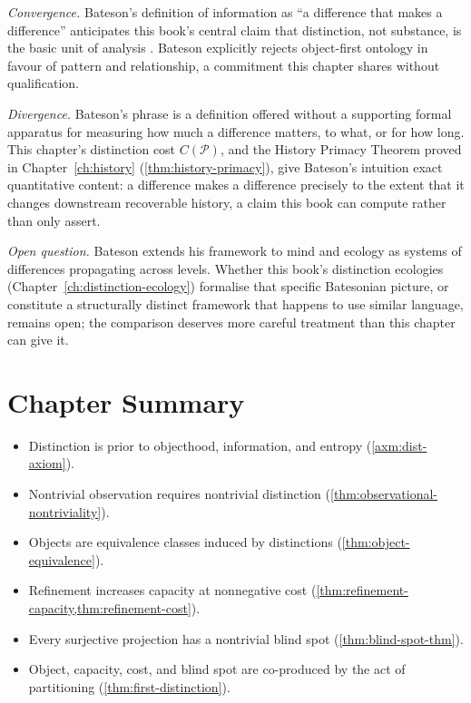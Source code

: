 \documentclass[12pt,twoside,openright]{book}
\newcommand{\partition}{\mathcal{P}}
\newenvironment{chapsummary}{%
  \begin{tcolorbox}[colback=DistBlue!5,colframe=DistBlue,
    title={\faBookOpen\enspace Summary},
    fonttitle=\sffamily\bfseries\color{white},
    attach boxed title to top left={yshift=-2mm,xshift=4mm},
    boxed title style={colback=DistBlue,rounded corners}]
  \begin{itemize}[nosep,leftmargin=*]}{%
  \end{itemize}\end{tcolorbox}}
\begin{document}
\emph{Convergence.} Bateson's definition of information as
``a difference that makes a difference'' anticipates this
book's central claim that distinction, not substance, is the
basic unit of analysis \parencite{bateson1972}. Bateson
explicitly rejects object-first ontology in favour of pattern
and relationship, a commitment this chapter shares without
qualification.

\emph{Divergence.} Bateson's phrase is a definition offered
without a supporting formal apparatus for measuring how much a
difference matters, to what, or for how long. This chapter's
distinction cost $C(\partition)$, and the History Primacy
Theorem proved in Chapter~\ref{ch:history}
(\cref{thm:history-primacy}), give Bateson's intuition exact
quantitative content: a difference makes a difference precisely
to the extent that it changes downstream recoverable history, a
claim this book can compute rather than only assert.

\emph{Open question.} Bateson extends his framework to mind and
ecology as systems of differences propagating across levels.
Whether this book's distinction ecologies
(Chapter~\ref{ch:distinction-ecology}) formalise that specific
Batesonian picture, or constitute a structurally distinct
framework that happens to use similar language, remains open;
the comparison deserves more careful treatment than this
chapter can give it.

\section*{Chapter Summary}
\begin{chapsummary}
  \item Distinction is prior to objecthood, information,
        and entropy (\cref{axm:dist-axiom}).
  \item Nontrivial observation requires nontrivial
        distinction
        (\cref{thm:observational-nontriviality}).
  \item Objects are equivalence classes induced by
        distinctions (\cref{thm:object-equivalence}).
  \item Refinement increases capacity at nonnegative cost
        (\cref{thm:refinement-capacity,thm:refinement-cost}).
  \item Every surjective projection has a nontrivial
        blind spot (\cref{thm:blind-spot-thm}).
  \item Object, capacity, cost, and blind spot are
        co-produced by the act of partitioning
        (\cref{thm:first-distinction}).
\end{chapsummary}
\end{document}
